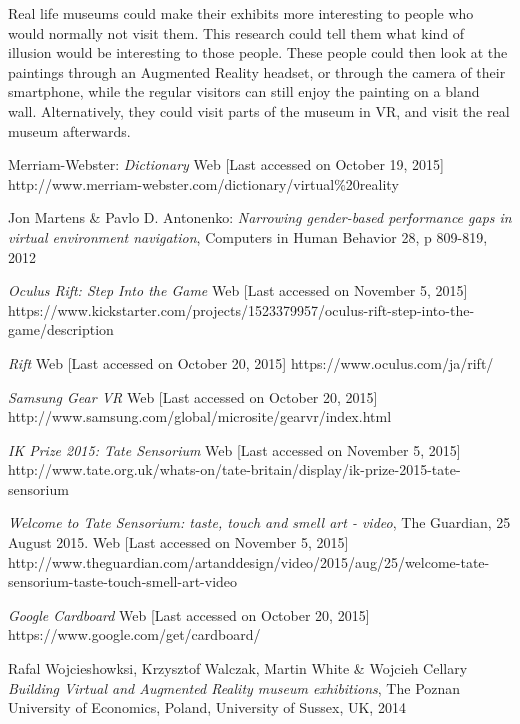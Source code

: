 \documentclass[a4paper]{article}
\begin{document}
Real life museums could make their exhibits more interesting to people who would normally not visit them. This research could tell them what kind of illusion would be interesting to those people. These people could then look at the paintings through an Augmented Reality headset, or through the camera of their smartphone, while the regular visitors can still enjoy the painting on a bland wall. Alternatively, they could visit parts of the museum in VR, and visit the real museum afterwards.



\begin{thebibliography}{99}

 Merriam-Webster:
\emph{Dictionary}
Web [Last accessed on October 19, 2015]
http://www.merriam-webster.com/dictionary/virtual\%20reality

 Jon Martens \& Pavlo D. Antonenko:
\emph{Narrowing gender-based performance gaps in virtual environment navigation},
Computers in Human Behavior 28, p 809-819, 2012

\emph{Oculus Rift: Step Into the Game}
Web [Last accessed on November 5, 2015]
https://www.kickstarter.com/projects/1523379957/oculus-rift-step-into-the-game/description

\emph{Rift}
Web [Last accessed on October 20, 2015]
https://www.oculus.com/ja/rift/

\emph{Samsung Gear VR}
Web [Last accessed on October 20, 2015]
http://www.samsung.com/global/microsite/gearvr/index.html


\emph{IK Prize 2015: Tate Sensorium}
Web [Last accessed on November 5, 2015]
http://www.tate.org.uk/whats-on/tate-britain/display/ik-prize-2015-tate-sensorium

\emph{Welcome to Tate Sensorium: taste, touch and smell art - video}, 
The Guardian,  25 August 2015.
Web [Last accessed on November 5, 2015]
http://www.theguardian.com/artanddesign/video/2015/aug/25/welcome-tate-sensorium-taste-touch-smell-art-video


\emph{Google Cardboard}
Web [Last accessed on October 20, 2015]
https://www.google.com/get/cardboard/

 Rafal Wojcieshowksi, Krzysztof Walczak, Martin White \& Wojcieh Cellary
\emph{Building Virtual and Augmented Reality museum exhibitions},
The Poznan University of Economics, Poland,
University of Sussex, UK, 2014


\end{thebibliography}
\end{document}
